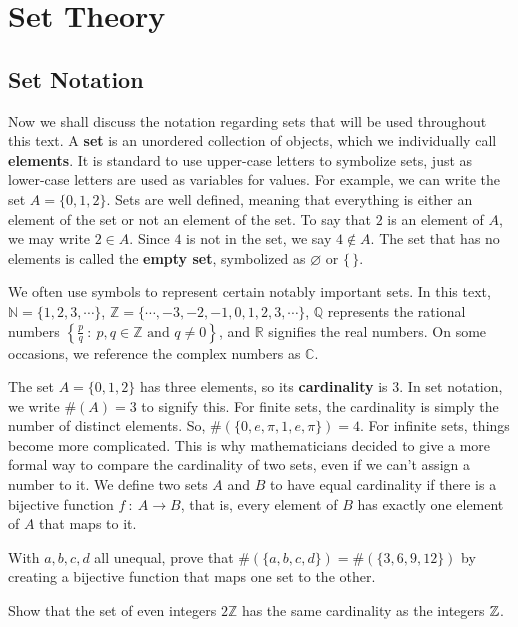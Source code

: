 \clearpage

\section{Set Theory}

\subsection{Set Notation}


Now we shall discuss the notation regarding sets that will be used throughout this text. A \textbf{set} is an unordered collection of objects, which we individually call \textbf{elements}.  It is standard to use upper-case letters to symbolize sets, just as lower-case letters are used as variables for values. For example, we can write the set $A=\{0, 1, 2\}$. Sets are well defined, meaning that everything is either an element of the set or not an element of the set. To say that $2$ is an element of $A$, we may write $2\in A$. Since $4$ is not in the set, we say $4\notin A$. The set that has no elements is called the \textbf{empty set}, symbolized as $\varnothing$ or $\{\, \}$.\par

We often use symbols to represent certain notably important sets. In this text, $\mathbb{N}=\{1,2,3,\cdots\}$, $\mathbb{Z}=\{\cdots, -3, -2, -1, 0, 1,2,3,\cdots\}$, $\mathbb{Q}$ represents the rational numbers $\left\{\frac{p}{q}\ :\ p,q\in\mathbb{Z}\text{ and } q\neq 0\right\}$, and $\mathbb{R}$ signifies the real numbers. On some occasions, we reference the complex numbers as $\mathbb{C}$. \par

The set $A=\{0,1,2\}$ has three elements, so its \textbf{cardinality} is 3. In set notation, we write $\#(A)=3$ to signify this. For finite sets, the cardinality is simply the number of distinct elements. So, $\#(\{0,e,\pi,1,e,\pi\})=4$. For infinite sets, things become more complicated. This is why mathematicians decided to give a more formal way to compare the cardinality of two sets, even if we can't assign a number to it. We define two sets $A$ and $B$ to have equal cardinality if there is a bijective function $f\ :\ A\to B$, that is, every element of $B$ has exactly one element of $A$ that maps to it. \par

\begin{exercise}
    With $a,b,c,d$ all unequal, prove that $\#(\{a,b,c,d\})  = \#(\{3,6,9,12\})$ by creating a bijective function that maps one set to the other. 
\end{exercise}
\vspace{-5mm}
\begin{exercise}
    Show that the set of even integers $2\mathbb{Z}$ has the same cardinality as the integers $\mathbb{Z}$. 
\end{exercise}

